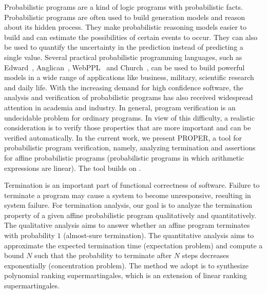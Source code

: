 \documentclass[runningheads]{llncs}
\begin{document}
Probabilistic programs are a kind of logic programs with probabilistic facts. Probabilistic programs are often used to build generation models and reason about its hidden process. They make probabilistic reasoning models easier to build and can estimate the possibilities of certain events to occur. They can also be used to quantify the uncertainty in the prediction instead of predicting a single value. Several practical probabilistic programming languages, such as Edward~\cite{tran2016edward}, Anglican~\cite{Dav2016Design}, WebPPL~\cite{Noah2014language} and Church~\cite{Noah2012language}, can be used to build powerful models in a wide range of applications like business, military, scientific research and daily life. %
With the increasing demand for high confidence software, the analysis and verification of probabilistic programs has also received widespread attention in academia and industry. 
In general, program verification is an undecidable problem for ordinary programs.
In view of this difficulty, a realistic consideration is to verify those properties that are more important and can be verified automatically. In the current work, we present PROPER, a tool for probabilistic program verification, namely, analyzing termination and assertions for affine probabilistic programs (probabilistic programs in which arithmetic expressions are linear). The tool builds on \cite{kris2016termination,cha2015algorithmic,Sankaranarayanan2013Static}. 

Termination is an important part of  functional correctness of software. Failure to terminate a program may cause a system to become unresponsive, resulting in system failure. For termination analysis, our goal is to analyze the termination property of a given affine probabilistic program qualitatively and quantitatively. The qualitative analysis aims to answer whether an affine program terminates with probability $1$ (almost-sure termination). The quantitative analysis aims to approximate the expected termination time (expectation problem) and compute a bound $N$ such that the probability to terminate after $N$ steps decreases exponentially (concentration problem). The method we adopt is to synthesize polynomial ranking supermartingales, which is an extension of linear ranking supermartingales. 
\end{document}
